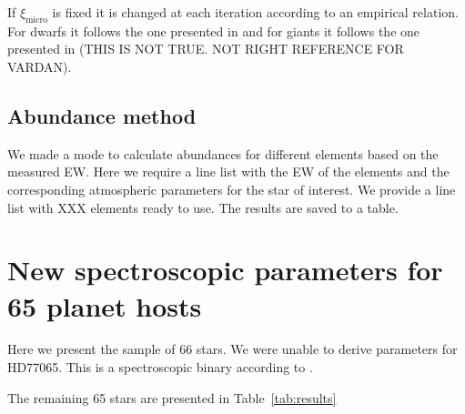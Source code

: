 \documentclass{aa}
\begin{document}
If $\xi_\mathrm{micro}$ is fixed it is changed at each iteration according to
an empirical relation. For dwarfs it follows the one presented in
\citet{Tsantaki2013} and for giants it follows the one presented in
\citet{Adibekyan2015} (THIS IS NOT TRUE. NOT RIGHT REFERENCE FOR VARDAN).



\subsection{Abundance method}
\label{sub:Abundance_method}

We made a mode to calculate abundances for different elements based on the
measured EW. Here we require a line list with the EW of the elements and
the corresponding atmospheric parameters for the star of interest. We provide
a line list with XXX elements ready to use. The results are saved to a table.











\section{New spectroscopic parameters for 65 planet hosts}
\label{sec:results}
Here we present the sample of 66 stars. We were unable to derive parameters for
HD77065. This is a spectroscopic binary according to \cite{Pourbaix2004}.

The remaining 65 stars are presented in Table~\ref{tab:results}
\end{document}
